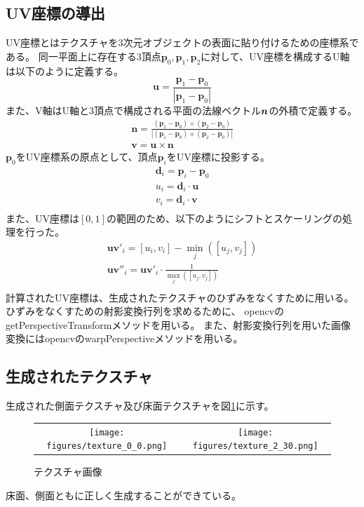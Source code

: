 \documentclass[]{jarticle}          %
\begin{document}
\subsection{UV座標の導出}
UV座標とはテクスチャを3次元オブジェクトの表面に貼り付けるための座標系である。
同一平面上に存在する3頂点$\mathbf{p}_0,\mathbf{p}_1,\mathbf{p}_2$に対して、UV座標を構成するU軸は以下のように定義する。
\begin{equation}
  \mathbf{u} = \frac{\mathbf{p}_1 - \mathbf{p}_0}{|\mathbf{p}_1 - \mathbf{p}_0|} 
\end{equation}
また、V軸はU軸と3頂点で構成される平面の法線ベクトル$\mbox{\boldmath $n$}$の外積で定義する。
\begin{gather}
  \mathbf{n} = \frac{(\mathbf{p}_1 - \mathbf{p}_0) \times (\mathbf{p}_2 - \mathbf{p}_0)}{|(\mathbf{p}_1 - \mathbf{p}_0) \times (\mathbf{p}_2 - \mathbf{p}_0)|} \\
  \mathbf{v} = \mathbf{u} \times \mathbf{n}
\end{gather}
$\mathbf{p}_0$をUV座標系の原点として、頂点$\mathbf{p}_i$をUV座標に投影する。
\begin{gather}
  \mathbf{d}_i = \mathbf{p}_i - \mathbf{p}_0 \\
  u_i = \mathbf{d}_i \cdot \mathbf{u} \\
  v_i = \mathbf{d}_i \cdot \mathbf{v} \\
\end{gather}
また、UV座標は$[0,1]$の範囲のため、以下のようにシフトとスケーリングの処理を行った。
\begin{gather}
  \mathbf{uv'}_i = [u_i, v_i] - \min_j([u_j, v_j])\\
  \mathbf{uv''}_i = \mathbf{uv'}_i \cdot \frac{1}{\max_j([u_j, v_j])}\\
\end{gather}
計算されたUV座標は、生成されたテクスチャのひずみをなくすために用いる。ひずみをなくすための射影変換行列を求めるために、
opencvのgetPerspectiveTransformメソッドを用いる。
また、射影変換行列を用いた画像変換にはopencvのwarpPerspectiveメソッドを用いる。

\subsection{生成されたテクスチャ}
生成された側面テクスチャ及び床面テクスチャを図\ref{two}に示す。
\begin{figure}[H]
  \begin{center}
    \begin{tabular}{cc}
      \texttt{[image: figures/texture\_0\_0.png]}&
      \texttt{[image: figures/texture\_2\_30.png]}\\
    \end{tabular}
  \end{center}
  \caption{テクスチャ画像}
  \label{two}
\end{figure}
床面、側面ともに正しく生成することができている。
\end{document}
